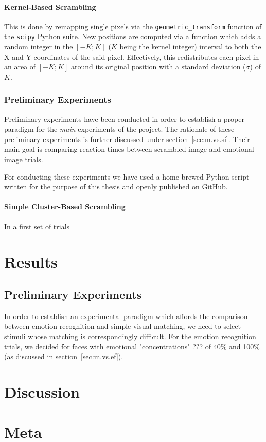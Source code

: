	    \subsubsection{Kernel-Based Scrambling}
	    This is done by remapping single pixels via the \colorbox{vlg}{\texttt{geometric\_transform}} function of the \colorbox{vlg}{\texttt{scipy}} Python suite. 
	    New positions are computed via a function which adds a random integer in the $[-K;K]$ ($K$ being the kernel integer) interval to both the X and Y coordinates of the said pixel.
	    Effectively, this redistributes each pixel in an area of $[-K;K]$ around its original position with a standard deviation ($\sigma$) of $K$. 
	\subsection{Preliminary Experiments} 
	Preliminary experiments have been conducted in order to establish a proper paradigm for the \textit{main} experiments of the project. 
	The rationale of these preliminary experiments is further discussed under section~\ref{sec:m.vs.si}. 
	Their main goal is comparing reaction times between scrambled image and emotional image trials.
	
	For conducting these experiments we have used a home-brewed Python script written for the purpose of this thesis and openly published on GitHub.
	    \subsubsection{Simple Cluster-Based Scrambling}
	    In a first set of trials 
\chapter{Results}
	\section{Preliminary Experiments}\label{sec:r.pe}
	In order to establish an experimental paradigm which affords the comparison between emotion recognition and simple visual matching, we need to select stimuli whose matching is correspondingly difficult.
	For the emotion recognition trials, we decided for faces with emotional "concentrations" ??? of 40\% and 100\% (as discussed in section~\ref{sec:m.vs.ef}).
\chapter{Discussion}
\chapter{Meta}


